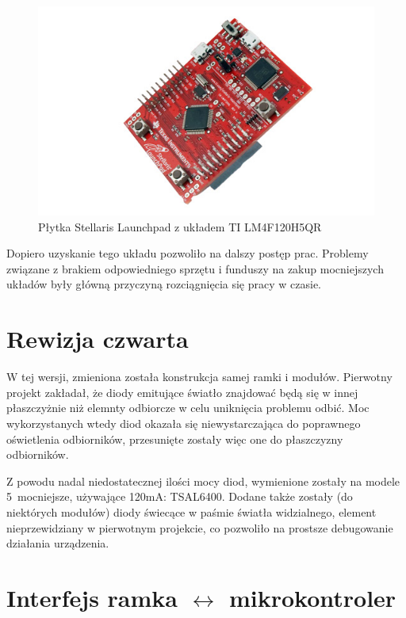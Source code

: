 \begin{figure}
 \centering
 \includegraphics[width=\textwidth]{gfx/stellaris_launchpad}
 \caption[Płytka Stellaris Launchpad]{Płytka Stellaris Launchpad z układem TI LM4F120H5QR}
 \label{fig:stellaris_launchpad}
\end{figure}

Dopiero uzyskanie tego układu pozwoliło na dalszy postęp prac. Problemy związane z brakiem odpowiedniego sprzętu i funduszy na zakup mocniejszych układów były główną przyczyną rozciągnięcia się pracy w czasie.\\

\section{Rewizja czwarta}

W tej wersji, zmieniona została konstrukcja samej ramki i modułów. Pierwotny projekt zakładał, że diody emitujące światło znajdować będą się w innej płaszczyżnie niż elemnty odbiorcze w celu uniknięcia problemu odbić. Moc wykorzystanych wtedy diod okazała się niewystarczająca do poprawnego oświetlenia odbiorników, przesunięte zostały więc one do płaszczyzny odbiorników.

Z powodu nadal niedostatecznej ilości mocy diod, wymienione zostały na modele 5\texttimes\  mocniejsze, używające 120mA: TSAL6400. Dodane także zostały (do niektórych modułów) diody świecące w paśmie światła widzialnego, element nieprzewidziany w pierwotnym projekcie, co pozwoliło na prostsze debugowanie działania urządzenia.\\

\section{Interfejs ramka $\leftrightarrow$ mikrokontroler}

